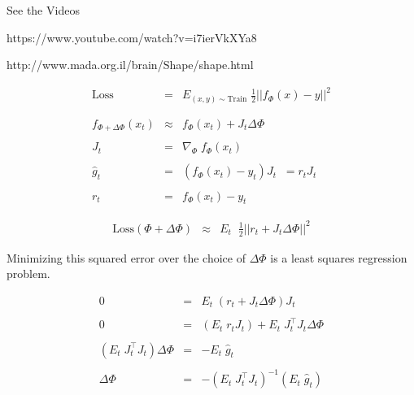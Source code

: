 {{


\centerline{See the Videos}

https://www.youtube.com/watch?v=i7ierVkXYa8

http://www.mada.org.il/brain/Shape/shape.html


\begin{eqnarray*}
  \mathrm{Loss} & = & E_{(x,y) \sim \mathrm{Train}}\;\frac{1}{2}||f_\Phi(x) - y||^2 \\
  \\
  \\
  f_{\Phi + \Delta \Phi}(x_t) & \approx & f_\Phi(x_t) + J_t\Delta \Phi \\
  \\
  J_t & = & \nabla_\Phi \;f_\Phi(x_t) \\
  \\
  \hat{g}_t & = & (f_\Phi(x_t) - y_t) J_t \;\;= r_tJ_t \\
  \\
  r_t & = & f_\Phi(x_t) - y_t 
\end{eqnarray*}


\begin{eqnarray*}
    \mathrm{Loss}(\Phi + \Delta \Phi) & \approx & E_t\;\;\frac{1}{2}||r_t + J_t\Delta\Phi||^2
\end{eqnarray*}

\vfill
Minimizing this squared error over the choice of $\Delta \Phi$ is a least squares regression problem.

\begin{eqnarray*}
  0 & = & E_t\; (r_t + J_t \Delta \Phi)J_t \\
  \\
  0 & = & (E_t\;r_tJ_t) + E_t \;J_t^\top J_t \Delta \Phi \\
  \\
  (E_t\; J_t^\top J_t) \Delta \Phi & = & - E_t\; \hat{g}_t \\
  \\
  \Delta \Phi & = & - (E_t\; J_t^\top J_t)^{-1} (E_t\; \hat{g}_t)
\end{eqnarray*}

}}
